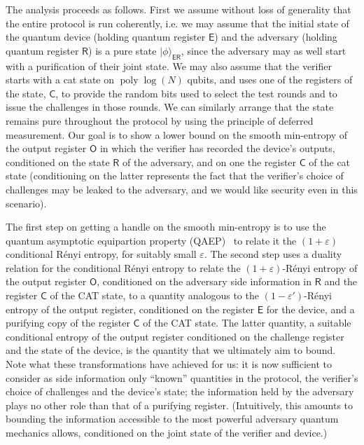 \documentclass[11pt]{article}
\theoremstyle{remark}
\theoremstyle{definition}
\newcommand{\ket}[1]{|#1\rangle}
\newcommand{\reg}[1]{{\textsf{#1}}}
\DeclareMathOperator{\poly}{poly}
\newcommand{\eps}{\varepsilon}
\begin{document}
The analysis proceeds as follows. First we assume without loss of generality that the entire protocol is run coherently, i.e. we may
assume that the initial state of the quantum device (holding quantum register $\reg{E}$) and the adversary (holding quantum register $\reg{R}$)
is a pure state $\ket{\phi}_\reg{ER}$, since the adversary may as well start with a purification of their joint state. We may also assume that the verifier 
starts with a cat state on $\poly\log(N)$ qubits, and uses one of the registers of the state, $\reg{C}$, to provide the random bits used to select the test rounds and to issue the challenges in those rounds. We can similarly  arrange that 
the state remains pure throughout the protocol by using the principle of deferred measurement. Our goal is to show a lower bound on the smooth
min-entropy of the output register $\reg{O}$ in which the verifier has recorded the device's outputs, conditioned on the state $\reg{R}$ of the adversary, and on one the register $\reg{C}$ of the cat state  (conditioning on the latter represents the fact that the verifier's choice of challenges may be leaked to the adversary, and we would like security even in this scenario). 

The first step on getting a handle on the smooth min-entropy is to use the quantum asymptotic equipartion property (QAEP)~\cite{tomamichel2009fully} to relate it the $(1+\eps)$ conditional R\'enyi entropy, for suitably small $\eps$. The second step uses a duality relation for the conditional R\'enyi entropy to relate the $(1+\eps)$-R\'enyi entropy of the output register $\reg{O}$, conditioned on the adversary side information in $\reg{R}$ and the register $\reg{C}$ of the CAT state, to a quantity analogous to the $(1-\eps')$-R\'enyi entropy of the output register, conditioned on the register $\reg{E}$ for the device, and a purifying copy of the register $\reg{C}$ of the CAT state. The latter quantity, a suitable conditional entropy of the output register conditioned on the challenge register and the state of the device, is the quantity that we ultimately aim to bound. Note what these transformations have achieved for us: it is now sufficient to consider as side information only ``known'' quantities in the protocol, the verifier's choice of challenges and the device's state; the information held by the adversary plays no other role than that of a purifying register. (Intuitively, this amounts to bounding the information accessible to the most powerful adversary quantum mechanics allows, conditioned on the joint state of the verifier and device.)
\end{document}
